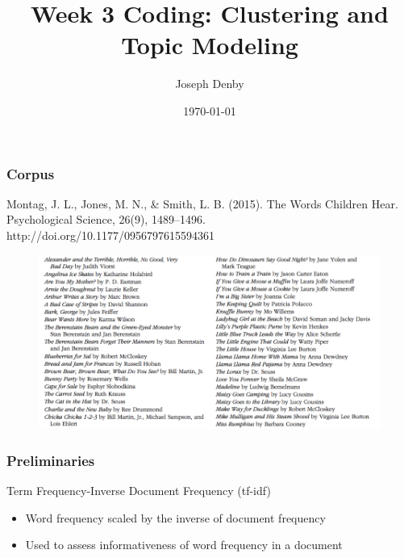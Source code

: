 \documentclass{beamer}
\title[Week 3 Coding]{Week 3 Coding: Clustering and Topic Modeling} %
\author{Joseph Denby} %
\institute[] %
{
Computational Content Analysis \\ %
\medskip
}
\date{\today} %
\begin{document}
\begin{frame}
\titlepage %
\end{frame}


\begin{frame}
	\frametitle{Corpus}
	Montag, J. L., Jones, M. N., \& Smith, L. B. (2015). The Words Children Hear. Psychological Science, 26(9), 1489–1496. http://doi.org/10.1177/0956797615594361
	\begin{figure}
		\includegraphics[width=0.9\linewidth]{corpus.png}
	\end{figure}
\end{frame}

\begin{frame}
	\frametitle{Preliminaries}
	Term Frequency-Inverse Document Frequency (tf-idf)	\begin{itemize}
		\item Word frequency scaled by the inverse of document frequency
		\item Used to assess informativeness of word frequency in a document
	\end{itemize}	
\end{frame}
\end{document}

